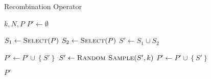 \begin{algorithm}[h]
  \caption{Recombination Operator}\label{alg:GENETIKUS-ALGORITMUS:REPRODUKCIO}
  \begin{algorithmic}[1]
    \Require $k, N, P$
    \State $P' \leftarrow \emptyset$

    \State $S_{1} \leftarrow \Call{Select}{P}$
    \State $S_{2} \leftarrow \Call{Select}{P}$
    \State $S' \leftarrow S_{1} \cup S_{2}$

    \State $P' \leftarrow P' \cup \left\{ S' \right\}$
    \Else
    \State $S' \leftarrow \Call{Random Sample}{S', k}$
    \State $P' \leftarrow P' \cup \left\{ S' \right\}$
    \EndIf
    \EndFor

    \State \Return $P'$
  \end{algorithmic}
\end{algorithm}
